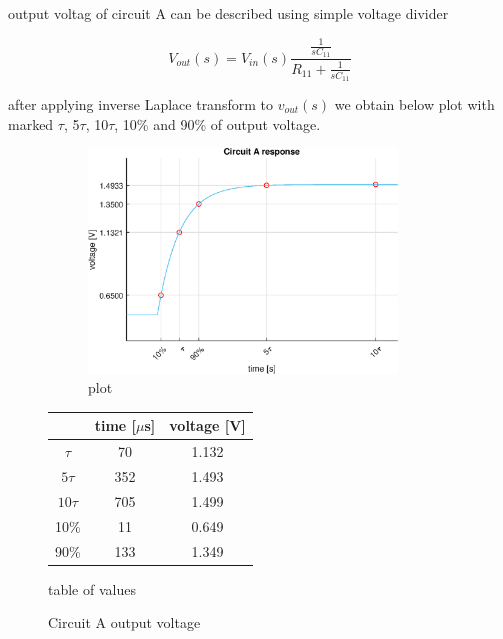 \documentclass[notitlepage, a4paper, 11pt]{article}
\begin{document}
	output voltag of circuit A can be described using simple voltage divider
	
	\begin{equation}
		V_{out}(s) = V_{in}(s) \dfrac{\frac{1}{sC_{11}}}{R_{11} +\frac{1}{sC_{11}}}
	\end{equation}
	
	after applying inverse Laplace transform to $v_{out}(s)$ we obtain below plot with marked $\tau$, 5$\tau$, 10$\tau$, 10\% and 90\% of output voltage.
	
	\begin{figure}[H]
		\centering
	\begin{subfigure}{0.6\textwidth}
	\includegraphics[width=0.9\textwidth]{../Matlab/img/CircuitA.eps}
	\caption{plot}
	\end{subfigure}	
	\hfill
	\begin{subtable}{0.38\textwidth}
		\centering
		\begin{tabular}{|c|c|c|}
			\hline
			& time [$\mu$s] & voltage [V] \\
			\hline
			$\tau$ & 70 & 1.132 \\
			\hline		
			$5\tau$ & 352 & 1.493 \\
			\hline
			$10\tau$ & 705 & 1.499 \\
			\hline
			10\% & 11 & 0.649 \\
			\hline
			90\% & 133 & 1.349 \\
			\hline
		\end{tabular}
		\caption{table of values}
	\end{subtable}
		\caption{Circuit A output voltage}
	\end{figure}
	
\end{document}
